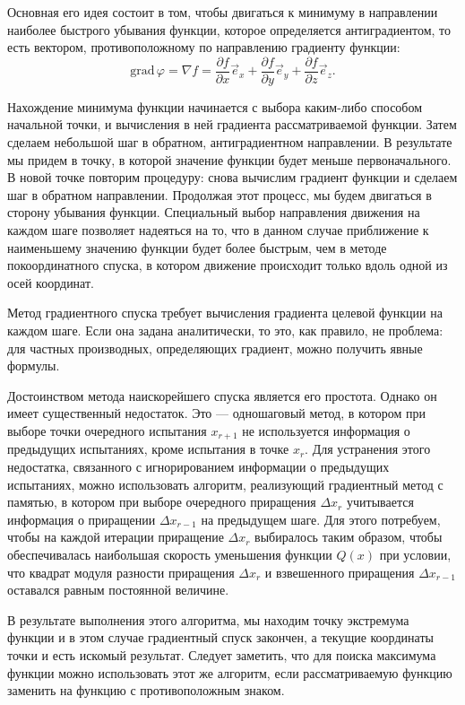 Основная его идея состоит в том, чтобы двигаться к минимуму в направлении наиболее быстрого убывания функции, которое определяется антиградиентом, то есть вектором, противоположному по направлению градиенту функции:
\begin{equation}
\mathrm{grad}\,\varphi = \nabla f = \frac {\partial f} {\partial x} \vec e_x + \frac {\partial f} {\partial y} \vec e_y + \frac {\partial f} {\partial z} \vec e_z.
\end{equation}

Нахождение минимума функции начинается с выбора каким-либо способом начальной точки, и вычисления в ней градиента рассматриваемой функции. Затем сделаем небольшой шаг в обратном, антиградиентном направлении. В результате мы придем в точку, в которой значение функции будет меньше первоначального. В новой точке повторим процедуру: снова вычислим градиент функции и сделаем шаг в обратном направлении. Продолжая этот процесс, мы будем двигаться в сторону убывания функции. Специальный выбор направления движения на каждом шаге позволяет надеяться на то, что в данном случае приближение к наименьшему значению функции будет более быстрым, чем в методе покоординатного спуска, в котором движение происходит только вдоль одной из осей координат.

Метод градиентного спуска требует вычисления градиента целевой функции на каждом шаге. Если она задана аналитически, то это, как правило, не проблема: для частных производных, определяющих градиент, можно получить явные формулы.

Достоинством метода наискорейшего спуска является его простота. Однако он имеет существенный недостаток. Это — одношаговый метод, в котором при выборе точки очередного испытания $x_{r+1}$ не используется информация о предыдущих испытаниях, кроме испытания в точке $x_r$. Для устранения этого недостатка, связанного с игнорированием информации о предыдущих испытаниях, можно использовать алгоритм, реализующий градиентный метод с памятью, в котором при выборе очередного приращения $\Delta x_r$ учитывается информация о приращении $\Delta x_{r-1}$ на предыдущем шаге. Для этого потребуем, чтобы на каждой итерации приращение $\Delta x_r$ выбиралось таким образом, чтобы обеспечивалась наибольшая скорость уменьшения функции $Q(x)$ при условии, что квадрат модуля разности приращения $\Delta x_r$ и взвешенного приращения $\Delta x_{r-1}$ оставался равным постоянной величине.

В результате выполнения этого алгоритма, мы находим точку экстремума функции и в этом случае градиентный спуск закончен, а текущие координаты точки и есть искомый результат. Следует заметить, что для поиска максимума функции можно использовать этот же алгоритм, если рассматриваемую функцию заменить на функцию с противоположным знаком.


